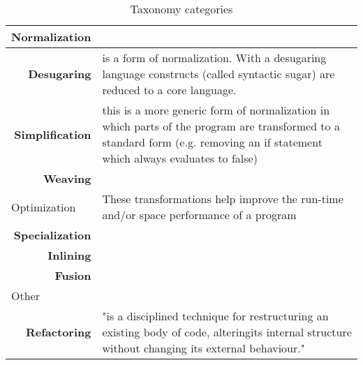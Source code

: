 \begin{table}[h]
\centering
\caption{Taxonomy categories}
\label{table-taxonomy-category}
\begin{adjustbox}{width=1\textwidth}
\begin{tabular}{rl}
\multicolumn{1}{l}{Normalization} &                                                                                                                                                                               \\ \hline
{\bf Desugaring}                  & is a form of normalization. With a desugaring language constructs (called syntactic sugar) are reduced to a core language.                                                    \\
{\bf Simplification}              & this is a more generic form of normalization in which parts of the program are transformed to a standard form (e.g. removing an if statement which always evaluates to false) \\
{\bf Weaving}                     &                                                                                                                                                                               \\
\multicolumn{1}{l}{Optimization}  & These transformations help improve the run-time and/or space performance of a program                                                                                         \\ \hline
{\bf Specialization}              &                                                                                                                                                                               \\
{\bf Inlining}                    &                                                                                                                                                                               \\
{\bf Fusion}                      &                                                                                                                                                                               \\
\multicolumn{1}{l}{Other}         &                                                                                                                                                                               \\ \hline
{\bf Refactoring}                 & "is a disciplined technique for restructuring an existing body of code, alteringits internal structure without changing its external behaviour."\footnotemark                 \\

\end{tabular}
\end{adjustbox}
\end{table}
